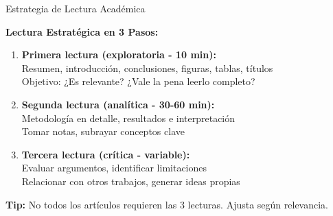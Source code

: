 \documentclass[11pt,aspectratio=169]{beamer}
\begin{document}
\begin{frame}{Estrategia de Lectura Académica}

	\textbf{Lectura Estratégica en 3 Pasos:}


	\begin{enumerate}
		\item \textbf{Primera lectura (exploratoria - 10 min):}\\
		      \small Resumen, introducción, conclusiones, figuras, tablas, títulos\\
		      Objetivo: ¿Es relevante? ¿Vale la pena leerlo completo?

		      \vspace{0.2cm}

		\item \textbf{Segunda lectura (analítica - 30-60 min):}\\
		      \small Metodología en detalle, resultados e interpretación\\
		      Tomar notas, subrayar conceptos clave

		      \vspace{0.2cm}

		\item \textbf{Tercera lectura (crítica - variable):}\\
		      \small Evaluar argumentos, identificar limitaciones\\
		      Relacionar con otros trabajos, generar ideas propias
	\end{enumerate}

	\vspace{0.3cm}


	\textbf{Tip:} No todos los artículos requieren las 3 lecturas. Ajusta según relevancia.

\end{frame}

\end{document}

